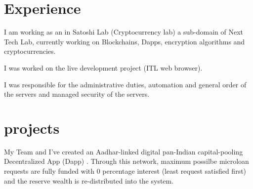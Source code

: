 \documentclass[]{deedy-resume-openfont}
\begin{document}
\begin{minipage}[t]{0.66\textwidth}


\section{Experience}

\vspace{\topsep} %
\begin{tightemize}
\item I am working as an  in Satoshi Lab (Cryptocurrency lab) a sub-domain of Next Tech Lab, currently working on Blockchains, Dapps, encryption algorithms and cryptocurrencies.
\end{tightemize}
\sectionsep

\vspace{\topsep} %
\begin{tightemize}
\item I was worked on the live development project (ITL web browser).
\end{tightemize}
\sectionsep

\begin{tightemize}
\item I was responsible for the administrative duties, automation and general order of the servers and managed security of the servers.

\end{tightemize}
\sectionsep



\section{projects}
My Team and I've created an Aadhar-linked digital pan-Indian capital-pooling Decentralized App (Dapp) . Through this network, maximum possilbe microloan requests are fully funded with 0 percentage interest (least request satisfied first) and the reserve wealth is re-distributed into the system.
\sectionsep


\end{minipage}
\end{document}

